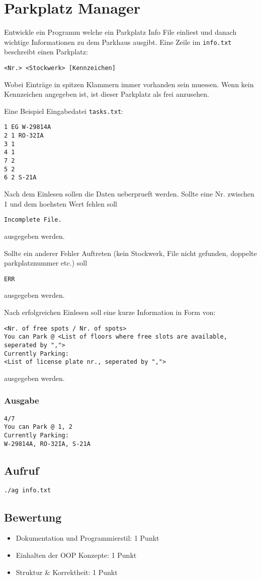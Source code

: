 \documentclass[a4paper,10pt]{article}
\begin{document}
\section*{Parkplatz Manager}

Entwickle ein Programm welche ein Parkplatz Info File einliest und danach wichtige Informationen zu dem Parkhaus ausgibt.
Eine Zeile im \texttt{info.txt} beschreibt einen Parkplatz:
\begin{verbatim}
<Nr.> <Stockwerk> [Kennzeichen]
\end{verbatim}
Wobei Einträge in spitzen Klammern immer vorhanden sein muessen. Wenn kein Kennzeichen angegeben ist, ist dieser Parkplatz als frei anzusehen.

Eine Beispiel Eingabedatei \texttt{tasks.txt}:
\begin{lstlisting}[frame=single]
1 EG W-29814A
2 1 RO-32IA
3 1
4 1
7 2
5 2
6 2 S-21A
\end{lstlisting}

Nach dem Einlesen sollen die Daten ueberprueft werden. Sollte eine Nr. zwischen 1 und dem hoehsten Wert fehlen soll
\begin{verbatim}
Incomplete File.
\end{verbatim}
ausgegeben werden.

Sollte ein anderer Fehler Auftreten (kein Stockwerk, File nicht gefunden, doppelte parkplatznummer etc.) soll
\begin{verbatim}
ERR
\end{verbatim}
ausgegeben werden.

Nach erfolgreichen Einlesen soll eine kurze Information in Form von:
\begin{verbatim}
<Nr. of free spots / Nr. of spots>
You can Park @ <List of floors where free slots are available, seperated by ",">
Currently Parking:
<List of license plate nr., seperated by ",">
\end{verbatim}
ausgegeben werden.

\subsubsection*{Ausgabe}
\begin{verbatim}
4/7
You can Park @ 1, 2
Currently Parking:
W-29814A, RO-32IA, S-21A
\end{verbatim}

\subsection*{Aufruf}
\texttt{./ag info.txt}

\subsection*{Bewertung}
\begin{itemize}
 \item Dokumentation und Programmierstil: 1 Punkt
 \item Einhalten der OOP Konzepte: 1 Punkt
 \item Struktur \& Korrektheit: 1 Punkt
\end{itemize}

\newpage
\end{document}
